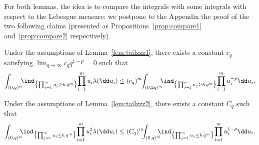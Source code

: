 For both lemmas, the idea is to compare the integrals with some integrals with respect to the Lebesgue measure: we postpone to the Appendix the proof of the two following claims (presented as Propositions~\ref{prop:compare1} and~\ref{prop:compare2} respectively).

\begin{claim}
Under the assumptions of Lemma~\ref{lem:tailzzz1},
there exists a constant $c_q$ satisfying
$\lim_{q\to\infty} c_q q^{1-p} =0$ such that
\begin{equation}
\label{plusdidee}
\int_{(0,q)^m}\hspace*{-2mm} \ind_{\bigl\{\prod^m_{j=1}u_j \geq h\, q^m\bigr\}}\! \prod_{i=1}^m u_i \lambda(\dd u_i) \le (c_q)^m\hspace*{-1mm}\int_{(0,2q)^m}\hspace*{-2mm} \ind_{\bigl\{\prod^m_{j=1}u_j \ge h\, q^m\bigr\}}\! \prod_{i=1}^m u_i^{-p} \dd u_i.
\end{equation}
\end{claim}

\begin{claim}
Under the assumptions of Lemma~\ref{lem:tailzzz2},
there exists a constant $C_q$ such that
\begin{equation}
\label{plusdidee2}
\int_{(0,q)^m} \hspace*{-2.5mm}\ind_{\bigl\{\prod^m_{j=1}u_j \le h\, q^m\bigr\}}\! \prod_{i=1}^m u_i^2 \lambda(\dd u_i) \le (C_q)^m\hspace*{-1.5mm}
\int_{(0,q)^m} \hspace*{-2.5mm}\ind_{\bigl\{\prod^m_{j=1} u_j \le h\, q^m\bigr\}}\! \prod_{i=1}^m u_i^{1-p} \dd u_i.
\end{equation}
\end{claim}

